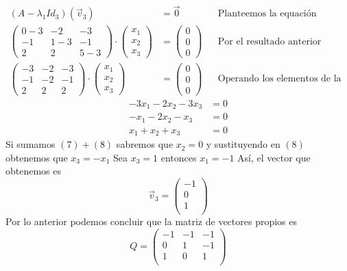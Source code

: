 \documentclass[letterpaper]{article}
\renewcommand{\*}{\cdot}
\theoremstyle{definition}
\begin{document}
\begin{align*}
(A-\lambda_1 Id_{3})(\vec{v}_3)&= \vec{0} && \text{Planteemos la equación}\\
\begin{pmatrix} 0-3 & -2 & -3 \\ -1 & 1-3 & -1 \\ 2 & 2 & 5-3 \end{pmatrix} \* \begin{pmatrix}
x_1\\
x_2\\
x_3
\end{pmatrix}  & = \begin{pmatrix}
0\\
0 \\
0
\end{pmatrix} && \text{Por el resultado anterior}\\
\begin{pmatrix} -3 & -2 & -3 \\ -1 & -2 & -1 \\ 2 & 2 & 2 \end{pmatrix} \* \begin{pmatrix}
x_1\\
x_2\\
x_3
\end{pmatrix}  & = \begin{pmatrix}
0\\
0 \\
0
\end{pmatrix} && \text{Operando los elementos de la matriz}
\end{align*}
\begin{align}
-3x_1 -2x_2 -3x_3 &= 0 \\
-x_1 -2x_2 -x_3 &= 0\\ 
x_1 +x_2 +x_3 &= 0 
\end{align}
Si sumamos $ (7) + (8) $ sabremos que $ x_2 = 0 $ y sustituyendo en $ (8) $ obtenemos que $ x_3 = -x_1 $ Sea $ x_3 = 1 $ entonces $ x_1 = -1 $
Así, el vector que obtenemos es \[ \vec{v}_3 = \begin{pmatrix}
-1\\
0\\
1\\
\end{pmatrix}
\] Por lo anterior podemos concluir que la matriz de vectores propios es 
 \[ Q = \begin{pmatrix}
-1 & -1 & -1\\
0 & 1 & -1\\
1 & 0 & 1\\
\end{pmatrix} \]
\end{document}
